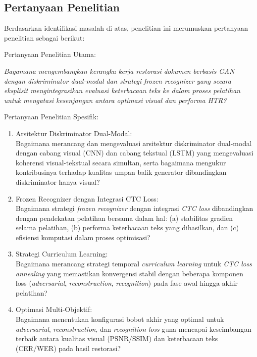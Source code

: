 \vspace{0pt}
\subsection{Pertanyaan Penelitian}
\label{subsec:pertanyaan-penelitian}

Berdasarkan identifikasi masalah di atas, penelitian ini merumuskan pertanyaan penelitian sebagai berikut:

\vspace{0.5em}
Pertanyaan Penelitian Utama:

\textit{Bagamana mengembangkan kerangka kerja restorasi dokumen berbasis GAN dengan diskriminator dual-modal dan strategi \textit{frozen recognizer} yang secara eksplisit mengintegrasikan evaluasi keterbacaan teks ke dalam proses pelatihan untuk mengatasi kesenjangan antara optimasi visual dan performa HTR?}

\vspace{0.8em}
Pertanyaan Penelitian Spesifik:

\begin{enumerate}[label=\arabic*., leftmargin=0.5cm]
    \item Arsitektur Diskriminator Dual-Modal: \\
    Bagaimana merancang dan mengevaluasi arsitektur diskriminator dual-modal dengan cabang visual (CNN) dan cabang tekstual (LSTM) yang mengevaluasi koherensi visual-tekstual secara simultan, serta bagaimana mengukur kontribusinya terhadap kualitas umpan balik generator dibandingkan diskriminator hanya visual?

    \item Frozen Recognizer dengan Integrasi CTC Loss: \\
    Bagaimana strategi \textit{frozen recognizer} dengan integrasi \textit{CTC loss} dibandingkan dengan pendekatan pelatihan bersama dalam hal: (a) stabilitas gradien selama pelatihan, (b) performa keterbacaan teks yang dihasilkan, dan (c) efisiensi komputasi dalam proses optimisasi?

    \item Strategi Curriculum Learning: \\
    Bagaimana merancang strategi temporal \textit{curriculum learning} untuk \textit{CTC loss annealing} yang memastikan konvergensi stabil dengan beberapa komponen loss (\textit{adversarial}, \textit{reconstruction}, \textit{recognition}) pada fase awal hingga akhir pelatihan?

    \item Optimasi Multi-Objektif: \\
    Bagaimana menentukan konfigurasi bobot akhir yang optimal untuk \textit{adversarial}, \textit{reconstruction}, dan \textit{recognition loss} guna mencapai keseimbangan terbaik antara kualitas visual (PSNR/SSIM) dan keterbacaan teks (CER/WER) pada hasil restorasi?
\end{enumerate}
\vspace{0.8em}
